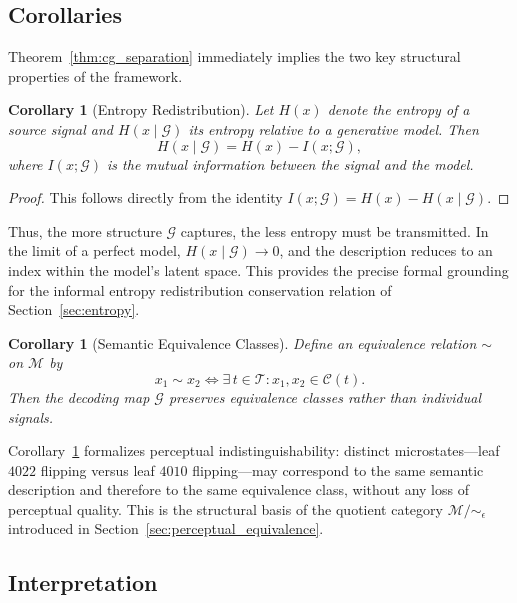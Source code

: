 \documentclass[11pt,a4paper]{article}
\newtheorem{corollary}[theorem]{Corollary}
\theoremstyle{definition}
\theoremstyle{remark}
\begin{document}
\subsection{Corollaries}

Theorem~\ref{thm:cg_separation} immediately implies the two key structural properties of the framework.

\begin{corollary}[Entropy Redistribution]
\label{cor:entropy_redist}
Let $H(x)$ denote the entropy of a source signal and $H(x \mid \mathcal{G})$ its entropy relative to a generative model. Then
\[
H(x \mid \mathcal{G}) = H(x) - I(x; \mathcal{G}),
\]
where $I(x; \mathcal{G})$ is the mutual information between the signal and the model.
\end{corollary}

\begin{proof}
This follows directly from the identity $I(x; \mathcal{G}) = H(x) - H(x \mid \mathcal{G})$.
\end{proof}

Thus, the more structure $\mathcal{G}$ captures, the less entropy must be transmitted. In the limit of a perfect model, $H(x \mid \mathcal{G}) \rightarrow 0$, and the description reduces to an index within the model's latent space. This provides the precise formal grounding for the informal entropy redistribution conservation relation of Section~\ref{sec:entropy}.

\begin{corollary}[Semantic Equivalence Classes]
\label{cor:semantic_equiv}
Define an equivalence relation $\sim$ on $\mathcal{M}$ by
\[
x_1 \sim x_2 \iff \exists\, t \in \mathcal{T} : x_1, x_2 \in \mathcal{C}(t).
\]
Then the decoding map $\mathcal{G}$ preserves equivalence classes rather than individual signals.
\end{corollary}

Corollary~\ref{cor:semantic_equiv} formalizes perceptual indistinguishability: distinct microstates---leaf $4022$ flipping versus leaf $4010$ flipping---may correspond to the same semantic description and therefore to the same equivalence class, without any loss of perceptual quality. This is the structural basis of the quotient category $\mathcal{M}/\!\sim_\epsilon$ introduced in Section~\ref{sec:perceptual_equivalence}.

\subsection{Interpretation}
\end{document}
